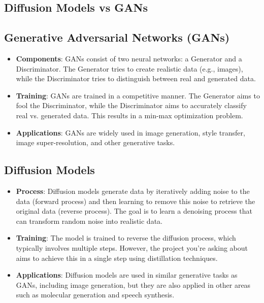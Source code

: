 \documentclass[11pt]{article}
\begin{document}
\subsection{Diffusion Models vs GANs}
\subsection{Generative Adversarial Networks (GANs)}
\begin{itemize}
    \item \textbf{Components}: GANs consist of two neural networks: a Generator and a Discriminator. The Generator tries to create realistic data (e.g., images), while the Discriminator tries to distinguish between real and generated data.
    \item \textbf{Training}: GANs are trained in a competitive manner. The Generator aims to fool the Discriminator, while the Discriminator aims to accurately classify real vs. generated data. This results in a min-max optimization problem.
    \item \textbf{Applications}: GANs are widely used in image generation, style transfer, image super-resolution, and other generative tasks.
\end{itemize}

\subsection{Diffusion Models}
\begin{itemize}
    \item \textbf{Process}: Diffusion models generate data by iteratively adding noise to the data (forward process) and then learning to remove this noise to retrieve the original data (reverse process). The goal is to learn a denoising process that can transform random noise into realistic data.
    \item \textbf{Training}: The model is trained to reverse the diffusion process, which typically involves multiple steps. However, the project you're asking about aims to achieve this in a single step using distillation techniques.
    \item \textbf{Applications}: Diffusion models are used in similar generative tasks as GANs, including image generation, but they are also applied in other areas such as molecular generation and speech synthesis.
\end{itemize}
\end{document}
